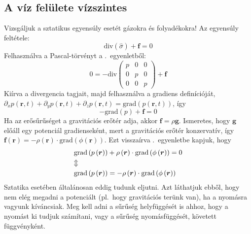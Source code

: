 \documentclass[12pt,a4paper]{scrartcl}
\let\mathbf\bm
\begin{document}
\subsection{A víz felülete vízszintes}
Vizsgáljuk a sztatikus egyensúly esetét gázokra és folyadékokra! Az egyensúly feltétele:
\[{\text{div}}\left( \hat \sigma  \right) + {\mathbf{f}} = 0\]
Felhasználva a Pascal-törvényt a .\ egyenletből:
\[0 =  - {\text{div}}\left( {\begin{array}{*{20}{c}}
  p&0&0 \\ 
  0&p&0 \\ 
  0&0&p 
\end{array}} \right) + {\mathbf{f}}\]
Kiírva a divergencia tagjait, majd felhasználva a gradiens definícióját, ${\partial _x}p\left( {{\mathbf{r}},t} \right) + {\partial _y}p\left( {{\mathbf{r}},t} \right) + {\partial _z}p\left( {{\mathbf{r}},t} \right) = {\text{grad}}\left( {p\left( {{\mathbf{r}},t} \right)} \right)$, így 
\begin{equation} \label{eq:stacionarius}
 - {\text{grad}}\left( p \right) + {\mathbf{f}} = 0
\end{equation}
Ha az erősűrűséget a gravitációs erőtér adja, akkor ${\mathbf{f}} = \rho {\mathbf{g}}$. Ismeretes, hogy ${\mathbf{g}}$ előáll egy potenciál gradienseként, mert a gravitációs erőtér konzervatív, így ${\mathbf{f}}\left( {\mathbf{r}} \right) =  - \rho \left( {\mathbf{r}} \right) \cdot {\text{grad}}\left( {\phi \left( {\mathbf{r}} \right)} \right)$. Ezt visszaírva .\ egyenletbe kapjuk, hogy
\begin{gather} \label{eq:stac_pot}
  {\text{grad}}\left( {p\left( {\mathbf{r}} \right)} \right) + \rho \left( {\mathbf{r}} \right) \cdot {\text{grad}}\left( {\phi \left( {\mathbf{r}} \right)} \right) = 0 \hfill \\
   \Updownarrow  \hfill \nonumber \\
  {\text{grad}}\left( {p\left( {\mathbf{r}} \right)} \right) =  - \rho \left( {\mathbf{r}} \right) \cdot {\text{grad}}\left( {\phi \left( {\mathbf{r}} \right)} \right) \hfill \label{eq:stac_pot_gradp}
\end{gather}
Sztatika esetében általánosan eddig tudunk eljutni. Azt láthatjuk ebből, hogy nem elég megadni a potenciált (pl.\ hogy gravitációs terünk van), ha a nyomásra vagyunk kíváncsiak. Meg kell adni a sűrűség helyfüggését is ahhoz, hogy a nyomást ki tudjuk számítani, vagy a sűrűség nyomásfüggését, követett függvényként.
\end{document}
